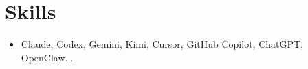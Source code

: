\documentclass[letterpaper,10pt]{article}
\newcommand{\resumeSubHeadingListStart}{\begin{itemize}[leftmargin=0.15in, label={}]}
\newcommand{\resumeSubHeadingListEnd}{\end{itemize}\vspace{-5pt}}
\begin{document}

\section{Skills}
\resumeSubHeadingListStart
    \item Claude, Codex, Gemini, Kimi, Cursor, GitHub Copilot, ChatGPT, OpenClaw...
\resumeSubHeadingListEnd



\end{document}
